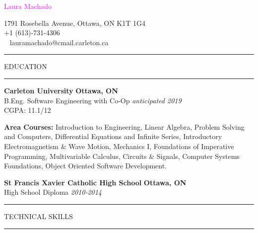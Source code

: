 \documentclass[letterpaper]{article}
\newenvironment{indentsection}[1]{\begin{list}{}%
{\setlength{\leftmargin}{#1}}%
\item[]
}{\end{list}}
\begin{document}
\pagestyle{empty}
\hspace*{-5mm}\textcolor{magenta}{\textsf{\Huge Laura Machado}}
\hfill \begin{minipage}{0.5\textwidth}
\flushright \textnormal{1791 Rosebella Avenue, Ottawa, ON K1T 1G4 \\
\normalsize \Telefon +1 (613)-731-4306 \\ \Letter\ \textnormal{ lauramachado@cmail.carleton.ca}}
\end{minipage}

\vspace{2mm}
\hrule

\begin{center}
\textsc{EDUCATION}
\vspace{2mm}
\hrule
\vspace{2mm}
\end{center}

\begin{itemize}

\item \textbf{Carleton University} \hfill \textbf{Ottawa, ON}\\
\textrm{B.Eng. Software Engineering with Co-Op} \hfill{\emph{anticipated 2019}}\\
\textrm{CGPA: 11.1/12}
\vspace{0mm}

\begin{indentsection}{0mm}
\textbf{Area Courses:}
\textrm{Introduction to Engineering, Linear Algebra, Problem Solving and Computers, Differential Equations and Infinite Series, Introductory Electromagnetism \& Wave Motion, Mechanics I, Foundations of Imperative Programming, Multivariable Calculus, Circuits \& Signals, Computer Systems Foundations, Object Oriented Software Development. }
\end{indentsection}

\item \textbf{St Francis Xavier Catholic High School} \hfill \textbf{Ottawa, ON}\\
\textrm{High School Diploma} \hfill \emph{2010-2014}

\end{itemize}

\begin{center}
\vspace{2mm}
\hrule
\vspace{2mm}
\textsc{TECHNICAL SKILLS}
\vspace{2mm}
\hrule
\vspace{2mm}
\end{center}
\end{document}
